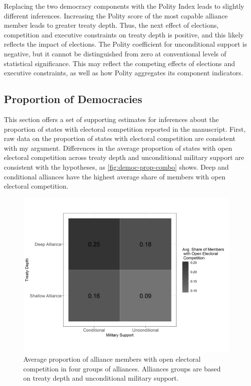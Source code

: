 \documentclass[12pt]{article}
\begin{document}
Replacing the two democracy components with the Polity Index leads to slightly different inferences. 
Increasing the Polity score of the most capable alliance member leads to greater treaty depth.
Thus, the next effect of elections, competition and executive constraints on treaty depth is positive, and this likely reflects the impact of elections. 
The Polity coefficient for unconditional support is negative, but it cannot be distinguished from zero at conventional levels of statistical significance. 
This may reflect the competing effects of elections and executive constraints, as well as how Polity aggregates its component indicators. 



\subsection{Proportion of Democracies}


This section offers a set of supporting estimates for inferences about the proportion of states with electoral competition reported in the manuscript. 
First, raw data on the proportion of states with electoral competition are consistent with my argument. 
Differences in the average proportion of states with open electoral competition across treaty depth and unconditional military support are consistent with the hypotheses, as \autoref{fig:democ-prop-combo} shows.
Deep and conditional alliances have the highest average share of members with open electoral competition.


\begin{figure}
\includegraphics[width=.95\textwidth]{democ-prop-combo.png}  
\caption{Average proportion of alliance members with open electoral competition in four groups of alliances. Alliances groups are based on treaty depth and unconditional military support.}
\label{fig:democ-prop-combo}
\end{figure}
\end{document}
